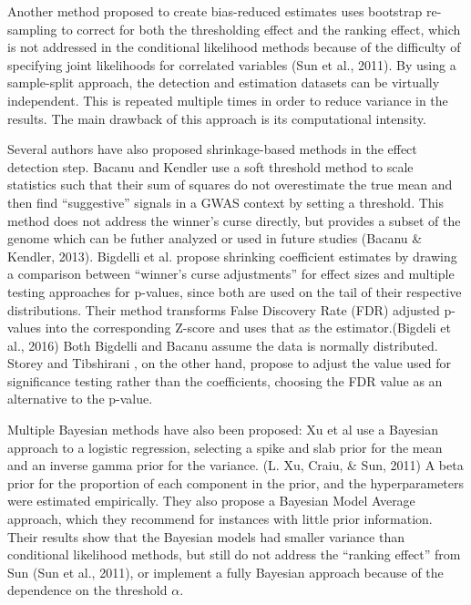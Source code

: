 \documentclass[12pt,twoside]{dukestatscithesis}
\theoremstyle{definition}
\theoremstyle{definition}
\theoremstyle{definition}
\theoremstyle{remark}
\begin{document}
Another method proposed to create bias-reduced estimates uses bootstrap
re-sampling to correct for both the thresholding effect and the ranking
effect, which is not addressed in the conditional likelihood methods
because of the difficulty of specifying joint likelihoods for correlated
variables (Sun et al., 2011). By using a sample-split approach, the
detection and estimation datasets can be virtually independent. This is
repeated multiple times in order to reduce variance in the results. The
main drawback of this approach is its computational intensity.

Several authors have also proposed shrinkage-based methods in the effect
detection step. Bacanu and Kendler use a soft threshold method to scale
statistics such that their sum of squares do not overestimate the true
mean and then find ``suggestive'' signals in a GWAS context by setting a
threshold. This method does not address the winner's curse directly, but
provides a subset of the genome which can be futher analyzed or used in
future studies (Bacanu \& Kendler, 2013). Bigdelli et al. propose
shrinking coefficient estimates by drawing a comparison between
``winner's curse adjustments'' for effect sizes and multiple testing
approaches for p-values, since both are used on the tail of their
respective distributions. Their method transforms False Discovery Rate
(FDR) adjusted p-values into the corresponding Z-score and uses that as
the estimator.(Bigdeli et al., 2016) Both Bigdelli and Bacanu assume the
data is normally distributed. Storey and Tibshirani , on the other hand,
propose to adjust the value used for significance testing rather than
the coefficients, choosing the FDR value as an alternative to the
p-value.

Multiple Bayesian methods have also been proposed: Xu et al use a
Bayesian approach to a logistic regression, selecting a spike and slab
prior for the mean and an inverse gamma prior for the variance. (L. Xu,
Craiu, \& Sun, 2011) A beta prior for the proportion of each component
in the prior, and the hyperparameters were estimated empirically. They
also propose a Bayesian Model Average approach, which they recommend for
instances with little prior information. Their results show that the
Bayesian models had smaller variance than conditional likelihood
methods, but still do not address the ``ranking effect'' from Sun (Sun
et al., 2011), or implement a fully Bayesian approach because of the
dependence on the threshold \(\alpha\).
\end{document}
